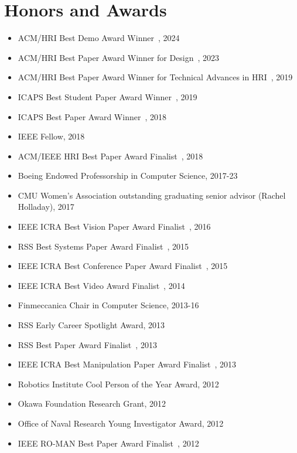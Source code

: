 

\section{Honors and Awards}
\begin{itemize}
\addtolength{\itemsep}{-0.5\baselineskip}
\item ACM/HRI Best Demo Award Winner~\cite{gordonjenamaninanavati2024demo}, 2024
\item ACM/HRI Best Paper Award Winner for Design~\cite{nanavati2023designprinciples}, 2023
\item ACM/HRI Best Paper Award Winner for Technical Advances in HRI~\cite{gallenberger2019skewering}, 2019
\item ICAPS Best Student Paper Award Winner~\cite{mandalika2019gls}, 2019
\item ICAPS Best Paper Award Winner~\cite{haghtalab2018laziness}, 2018
\item IEEE Fellow, 2018
\item ACM/IEEE HRI Best Paper Award Finalist~\cite{chen2018trust}, 2018
\item Boeing Endowed Professorship in Computer Science, 2017-23
\item CMU Women’s Association outstanding graduating senior advisor (Rachel Holladay), 2017
\item IEEE ICRA Best Vision Paper Award Finalist~\cite{klingensmith2016armslamconf}, 2016
\item RSS Best Systems Paper Award Finalist~\cite{klingensmith2015chisel}, 2015
\item IEEE ICRA Best Conference Paper Award Finalist~\cite{dragan2015dmp}, 2015
\item IEEE ICRA Best Video Award Finalist~\cite{chavandafle2014extrinsic}, 2014
\item Finmeccanica Chair in Computer Science, 2013-16
\item RSS Early Career Spotlight Award, 2013
\item RSS Best Paper Award Finalist~\cite{dragan2013legible}, 2013
\item IEEE ICRA Best Manipulation Paper Award Finalist~\cite{javdani2013tactile}, 2013
\item Robotics Institute Cool Person of the Year Award, 2012
\item Okawa Foundation Research Grant, 2012
\item Office of Naval Research Young Investigator Award, 2012
\item IEEE RO-MAN Best Paper Award Finalist~\cite{dragan2012custom}, 2012

\end{itemize}
